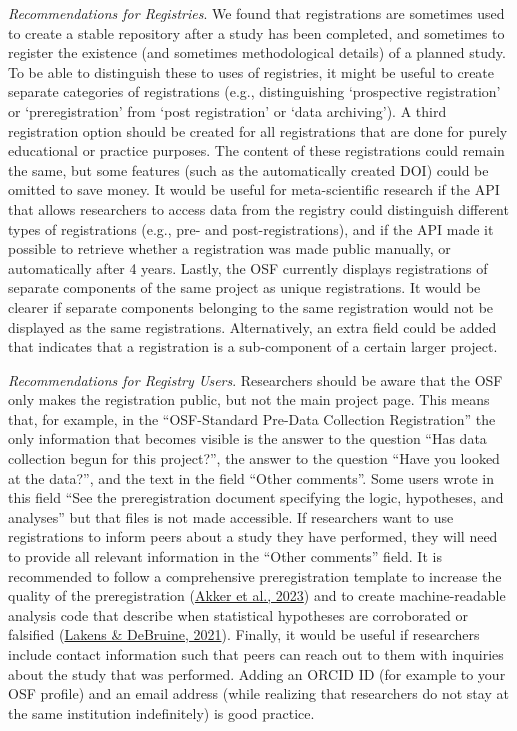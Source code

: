 \documentclass[
  ,jou, a4paper,floatsintext]{apa6}
\begin{document}
\emph{Recommendations for Registries}. We found that registrations are sometimes used to create a stable repository after a study has been completed, and sometimes to register the existence (and sometimes methodological details) of a planned study. To be able to distinguish these to uses of registries, it might be useful to create separate categories of registrations (e.g., distinguishing `prospective registration' or `preregistration' from `post registration' or `data archiving'). A third registration option should be created for all registrations that are done for purely educational or practice purposes. The content of these registrations could remain the same, but some features (such as the automatically created DOI) could be omitted to save money. It would be useful for meta-scientific research if the API that allows researchers to access data from the registry could distinguish different types of registrations (e.g., pre- and post-registrations), and if the API made it possible to retrieve whether a registration was made public manually, or automatically after 4 years. Lastly, the OSF currently displays registrations of separate components of the same project as unique registrations. It would be clearer if separate components belonging to the same registration would not be displayed as the same registrations. Alternatively, an extra field could be added that indicates that a registration is a sub-component of a certain larger project.

\emph{Recommendations for Registry Users}. Researchers should be aware that the OSF only makes the registration public, but not the main project page. This means that, for example, in the ``OSF-Standard Pre-Data Collection Registration'' the only information that becomes visible is the answer to the question ``Has data collection begun for this project?'', the answer to the question ``Have you looked at the data?'', and the text in the field ``Other comments''. Some users wrote in this field ``See the preregistration document specifying the logic, hypotheses, and analyses'' but that files is not made accessible. If researchers want to use registrations to inform peers about a study they have performed, they will need to provide all relevant information in the ``Other comments'' field. It is recommended to follow a comprehensive preregistration template to increase the quality of the preregistration (\protect\hyperlink{ref-akker_effectiveness_2023}{Akker et al., 2023}) and to create machine-readable analysis code that describe when statistical hypotheses are corroborated or falsified (\protect\hyperlink{ref-lakens_improving_2021}{Lakens \& DeBruine, 2021}). Finally, it would be useful if researchers include contact information such that peers can reach out to them with inquiries about the study that was performed. Adding an ORCID ID (for example to your OSF profile) and an email address (while realizing that researchers do not stay at the same institution indefinitely) is good practice.
\end{document}
